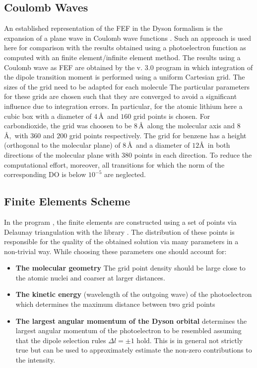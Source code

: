 \subsection{Coulomb Waves}
An established representation of the FEF in the Dyson formalism is the expansion of a plane wave in Coulomb wave functions \cite{ezDyson,do_modCoul,DO_TDDFT}.
Such an approach is used here for comparison with the results obtained using a photoelectron function as computed with an finite element/infinite element method.
The results using a Coulomb wave as FEF are obtained by the  v. 3.0 \cite{ezDyson} program in which integration of the dipole transition moment  is performed using a uniform Cartesian grid.
The sizes of the grid need to be adapted for each molecule
The particular parameters for these grids are chosen such that they are converged to avoid a significant influence due to integration errors.
In particular, for the atomic lithium here a cubic box with a diameter of $4\,$\AA\, and $160$ grid points is chosen.
For carbondioxide, the grid was choosen to be $8\,$\AA\, along the molecular axis and $8\,$\AA,\ with $360$ and $200$ grid points respectively.
The grid for benzene has a height (orthogonal to the molecular plane) of $8\,$\AA\, and a diameter of $12$\AA\, in both directions of the molecular plane with $380$ points in each direction.
To reduce the computational effort, moreover, all transitions for which the norm of the corresponding DO is below $10^{-5}$ are neglected.

\subsection{Finite Elements Scheme}
\label{ch:GridSetup}
In the program , the finite elements are constructed using a set of points via Delaunay triangulation %
with the library  \cite{tetgen}.
The distribution of these points is responsible for the quality of the obtained solution via many parameters in a non-trivial way.
While choosing these parameters one should account for:
\begin{itemize}
   \item \textbf{The molecular geometry} The grid point density should be large close to the atomic nuclei and coarser at larger distances.
   \item \textbf{The kinetic energy} (wavelength of the outgoing wave) of the photoelectron which determines the maximum distance between two grid points
   \item \textbf{The largest angular momentum of the Dyson orbital} determines the largest angular momentum of the photoelectron to be resembled assuming that the dipole selection rules $\Delta l=\pm 1$ hold.
   This is in general not strictly true but can be used to approximately estimate the non-zero contributions to the intensity.
\end{itemize}

